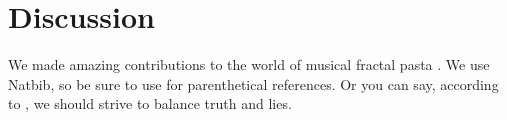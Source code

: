 \documentclass[12pt]{article}
\begin{document}
\section{Discussion} 

We made amazing contributions to the world of musical fractal pasta 
\citep{McDonald2017,Tibshirani2013}. We use Natbib, so be sure to use
\citep{Stein1981} for parenthetical references. Or you can say, according to
\citet{HastieTibshirani2009}, we should strive to balance truth and lies.




\end{document}
